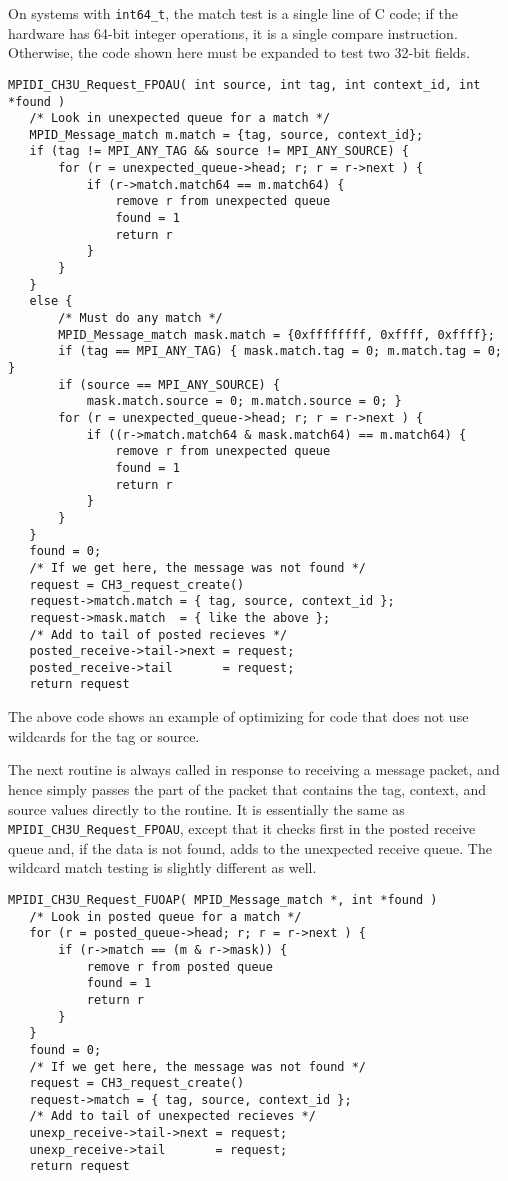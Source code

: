 \documentclass{article}
\def\code{\begingroup\makeustext\eatcode}
\def\eatcode#1{\texttt{#1}\endgroup}
\begin{document}
On systems with \code{int64_t}, the match test is a single line of C code; if
the hardware has 64-bit integer operations, it is a single compare
instruction.  Otherwise, the code shown here must be expanded to test
two 32-bit fields.  

\begin{verbatim}
MPIDI_CH3U_Request_FPOAU( int source, int tag, int context_id, int *found )
   /* Look in unexpected queue for a match */
   MPID_Message_match m.match = {tag, source, context_id};
   if (tag != MPI_ANY_TAG && source != MPI_ANY_SOURCE) {
       for (r = unexpected_queue->head; r; r = r->next ) {
           if (r->match.match64 == m.match64) {
               remove r from unexpected queue
               found = 1
               return r
           }
       }
   }
   else {
       /* Must do any match */
       MPID_Message_match mask.match = {0xffffffff, 0xffff, 0xffff};
       if (tag == MPI_ANY_TAG) { mask.match.tag = 0; m.match.tag = 0; }
       if (source == MPI_ANY_SOURCE) { 
           mask.match.source = 0; m.match.source = 0; }
       for (r = unexpected_queue->head; r; r = r->next ) {
           if ((r->match.match64 & mask.match64) == m.match64) {
               remove r from unexpected queue
               found = 1
               return r
           }
       }
   }
   found = 0;
   /* If we get here, the message was not found */
   request = CH3_request_create()
   request->match.match = { tag, source, context_id };
   request->mask.match  = { like the above };
   /* Add to tail of posted recieves */
   posted_receive->tail->next = request;
   posted_receive->tail       = request;
   return request
\end{verbatim}
The above code shows an example of optimizing for code that does not
use wildcards for the tag or source.  

The next routine is always called in response to receiving a message packet,
and hence simply passes the part of the packet that contains the tag, context,
and source values directly to the routine.  It is essentially the same as 
\code{MPIDI_CH3U_Request_FPOAU}, except that it checks first in the posted
receive queue and, if the data is not found, adds to the unexpected receive
queue.  The wildcard match testing is slightly different as well.
\begin{verbatim}
MPIDI_CH3U_Request_FUOAP( MPID_Message_match *, int *found )
   /* Look in posted queue for a match */
   for (r = posted_queue->head; r; r = r->next ) {
       if (r->match == (m & r->mask)) {
           remove r from posted queue
           found = 1
           return r
       }
   }
   found = 0;
   /* If we get here, the message was not found */
   request = CH3_request_create()
   request->match = { tag, source, context_id };
   /* Add to tail of unexpected recieves */
   unexp_receive->tail->next = request;
   unexp_receive->tail       = request;
   return request
\end{verbatim}
\end{document}
